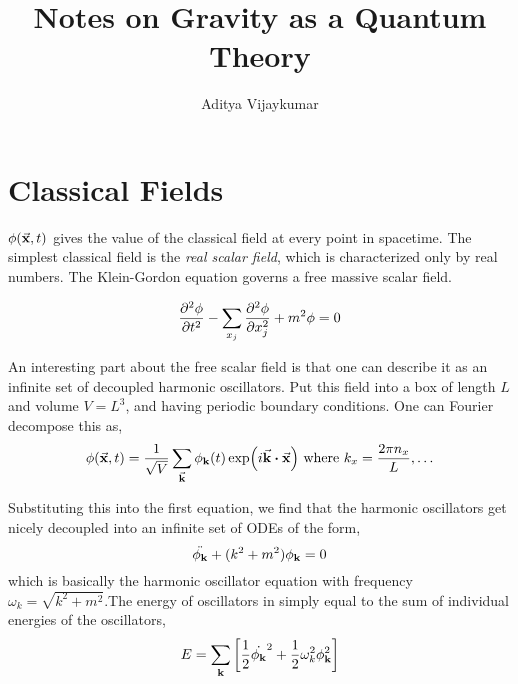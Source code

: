 \documentclass[a4paper,11pt]{article}
\title{\textbf{Notes on Gravity as a Quantum Theory}}
\author{Aditya Vijaykumar}
\affiliation{International Centre for Theoretical Sciences, Bengaluru, India.}
\begin{document}
\maketitle \tableofcontents

\section{Classical Fields}
$\phi(\va{x},t)$ gives the value of the classical field at every point in spacetime. The simplest classical field is the \textit{real scalar field}, which is characterized only by real numbers. The Klein-Gordon equation governs a free massive scalar field.

$$\pdv[2]{\phi}{t} - \sum_{x_j} \pdv[2]{\phi}{x_j} + m^2 \phi =0 $$

An interesting part about the free scalar field is that one can describe it as an infinite set of decoupled harmonic oscillators. Put this field into a box of length $L$ and volume $V=L^3$, and having periodic boundary conditions. One can Fourier decompose this as,
$$\phi(\va{x},t) = \frac{1}{\sqrt{V}} \sum_{\va{k}} \phi_{\vb{k}} (t) \exp(i \va{k}\vdot\va{x}) \text{ where } k_x =\frac
{2\pi n_x}{L} ,\ldots$$

Substituting this into the first equation, we find that the harmonic oscillators get nicely decoupled into an infinite set of ODEs of the form,
$$\ddot{\phi_{\vb{k}}} +(k^2+m^2)\phi_{\vb{k}} = 0$$
which is basically the harmonic oscillator equation with frequency $\omega_k = \sqrt{k^2 + m^2}$.The energy of oscillators in simply equal to the sum of individual energies of the oscillators,
$$E = \sum_{\vb{k}}\left[ \frac{1}{2} \dot{\phi_{\vb{k}}}^2 + \frac{1}{2}\omega_k^2 \phi_{\vb{k}}^2 \right]$$
\end{document}
